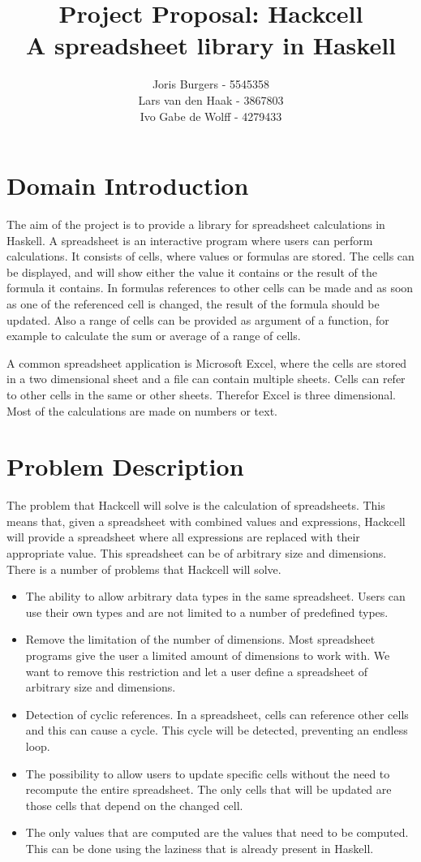\documentclass{article}
\title{
	Project Proposal: Hackcell \\
	\vskip 0.5cm
	\large{A spreadsheet library in Haskell}
}
\author{Joris Burgers - 5545358\\ Lars van den Haak - 3867803\\ Ivo Gabe de Wolff - 4279433}
\begin{document}
	\maketitle
	\section{Domain Introduction}
	The aim of the project is to provide a library for spreadsheet calculations in Haskell. A spreadsheet is an interactive program where users can perform calculations. It consists of cells, where values or formulas are stored. The cells can be displayed, and will show either the value it contains or the result of the formula it contains. In formulas references to other cells can be made and as soon as one of the referenced cell is changed, the result of the formula should be updated. Also a range of cells can be provided as argument of a function, for example to calculate the sum or average of a range of cells. 
	
	A common spreadsheet application is Microsoft Excel, where the cells are stored in a two dimensional sheet and a file can contain multiple sheets. Cells can refer to other cells in the same or other sheets. Therefor Excel is three dimensional. Most of the calculations are made on numbers or text. 
	
	\section{Problem Description}
	The problem that Hackcell will solve is the calculation of spreadsheets. This means that, given a spreadsheet with combined values and expressions, Hackcell will provide a spreadsheet where all expressions are replaced with their appropriate value. This spreadsheet can be of arbitrary size and dimensions. There is a number of problems that Hackcell will solve.
\begin{itemize}
	\item The ability to allow arbitrary data types in the same spreadsheet. Users can use their own types and are not limited to a number of predefined types. 
	\item Remove the limitation of the number of dimensions. Most spreadsheet programs give the user a limited amount of dimensions to work with. We want to remove this restriction and let a user define a spreadsheet of arbitrary size and dimensions.
	\item Detection of cyclic references. In a spreadsheet, cells can reference other cells and this can cause a cycle. This cycle will be detected, preventing an endless loop.
	\item The possibility to allow users to update specific cells without the need to recompute the entire spreadsheet. The only cells that will be updated are those cells that depend on the changed cell.
	\item The only values that are computed are the values that need to be computed. This can be done using the laziness that is already present in Haskell. 
\end{itemize}	
	
\end{document}
